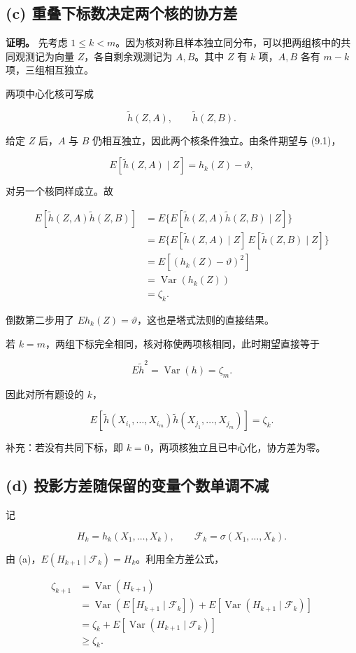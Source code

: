 \subsection{(c) 重叠下标数决定两个核的协方差}

\textbf{证明。} 先考虑 $1\le k<m$。因为核对称且样本独立同分布，可以把两组核中的共同观测记为向量 $Z$，各自剩余观测记为 $A,B$。其中 $Z$ 有 $k$ 项，$A,B$ 各有 $m-k$ 项，三组相互独立。

两项中心化核可写成

\[
\widetilde h(Z,A),\qquad \widetilde h(Z,B).
\]

给定 $Z$ 后，$A$ 与 $B$ 仍相互独立，因此两个核条件独立。由条件期望与 (9.1)，

\[
E[\widetilde h(Z,A)\mid Z]
=h_k(Z)-\vartheta,
\]

对另一个核同样成立。故

\[
\begin{aligned}
E[\widetilde h(Z,A)\widetilde h(Z,B)]
&=E\{E[\widetilde h(Z,A)\widetilde h(Z,B)\mid Z]\}\\
&=E\{E[\widetilde h(Z,A)\mid Z]\,
E[\widetilde h(Z,B)\mid Z]\}\\
&=E[(h_k(Z)-\vartheta)^2]\\
&=\operatorname{Var}(h_k(Z))\\
&=\zeta_k.
\end{aligned}
\]

倒数第二步用了 $E h_k(Z)=\vartheta$，这也是塔式法则的直接结果。

若 $k=m$，两组下标完全相同，核对称使两项核相同，此时期望直接等于

\[
E\widetilde h^2=\operatorname{Var}(h)=\zeta_m.
\]

因此对所有题设的 $k$，

\[
\boxed{
E[\widetilde h(X_{i_1},\ldots,X_{i_m})
\widetilde h(X_{j_1},\ldots,X_{j_m})]=\zeta_k.}
\]

补充：若没有共同下标，即 $k=0$，两项核独立且已中心化，协方差为零。

\subsection{(d) 投影方差随保留的变量个数单调不减}

记

\[
H_k=h_k(X_1,\ldots,X_k),\qquad
\mathcal F_k=\sigma(X_1,\ldots,X_k).
\]

由 (a)，$E(H_{k+1}\mid\mathcal F_k)=H_k$。利用全方差公式，

\[
\begin{aligned}
\zeta_{k+1}
&=\operatorname{Var}(H_{k+1})\\
&=\operatorname{Var}(E[H_{k+1}\mid\mathcal F_k])
+E[\operatorname{Var}(H_{k+1}\mid\mathcal F_k)]\\
&=\zeta_k+E[\operatorname{Var}(H_{k+1}\mid\mathcal F_k)]\\
&\ge\zeta_k.
\end{aligned}
\]

